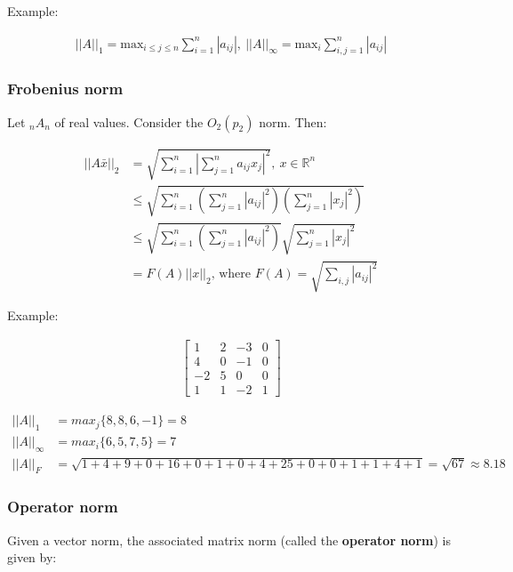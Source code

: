 Example:

\begin{align*}
  ||A||_1 = \text{max}_{i \leq j \leq n} \sum_{i=1}^{n} |a_{ij}|,\
  ||A||_\infty = \text{max}_i \sum_{i,j=1}^n |a_{ij}|
\end{align*}

\subsubsection{Frobenius norm}

Let ${}_{n}A_{n}$ of real values. Consider the $O_2(p_2)$ norm. Then:

\begin{align*}
  ||A\bar{x}||_2 & = \sqrt{\sum_{i=1}^n | \sum_{j=1}^n a_{ij} x_j |^2},\ x \in \mathbb{R}^n \\
                 & \leq \sqrt{\sum_{i=1}^n ( \sum_{j=1}^n |a_{ij}|^2 ) (\sum_{j=1}^n |x_j|^2)} \\
                 & \leq \sqrt{\sum_{i=1}^n ( \sum_{j=1}^n |a_{ij}|^2 )} \sqrt{\sum_{j=1}^n |x_j|^2} \\
                 & = F(A) ||x||_2\text{, where } F(A) = \sqrt{\sum_{i,j} |a_{ij}|^2}
\end{align*}

Example:

\begin{align*}
  \begin{bmatrix}
    1 & 2 & -3 & 0 \\
    4 & 0 & -1 & 0 \\
    -2 & 5 & 0 & 0 \\
    1 & 1 & -2 & 1
  \end{bmatrix}
\end{align*}

\begin{align*}
  ||A||_1 &= max_j \{8, 8, 6, -1\} = 8 \\
  ||A||_\infty &= max_i \{6, 5, 7, 5\} = 7 \\
  ||A||_F &= \sqrt{1 + 4 + 9 + 0 + 16 + 0 + 1 + 0 + 4 + 25 + 0 + 0 + 1 + 1 + 4 + 1} = \sqrt{67} \approx \mathbf{8.18}
\end{align*}


\subsubsection{Operator norm}

Given a vector norm, the associated matrix norm (called the \textbf{operator norm}) is given by:


